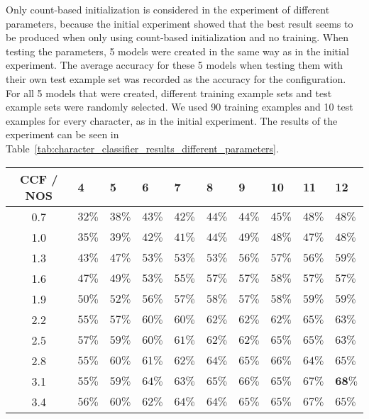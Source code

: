 Only count-based initialization is considered in the experiment of different parameters, because the initial experiment showed that the best result seems to be produced when only using count-based initialization and no training.
When testing the parameters, 5 models were created in the same way as in the initial experiment. 
The average accuracy for these 5 models when testing them with their own test example set was recorded as the accuracy for the configuration. 
For all 5 models that were created, different training example sets and test example sets were randomly selected. 
We used 90 training examples and 10 test examples for every character, as in the initial experiment. 
The results of the experiment can be seen in Table~\ref{tab:character_classifier_results_different_parameters}.

\begin{table}[htb]
  \begin{center}
  \begin{tabular}{ c | l l l l l l l l l }
CCF / NOS &    4   & 5      & 6      & 7      & 8      & 9      & 10     & 11     & 12 \\ \hline
0.7     &  $32\%$  &  $38\%$  &  $43\%$  &  $42\%$  &  $44\%$  &  $44\%$  &  $45\%$  &  $48\%$  &  $48\%$  \\
1.0     &  $35\%$  &  $39\%$  &  $42\%$  &  $41\%$  &  $44\%$  &  $49\%$  &  $48\%$  &  $47\%$  &  $48\%$  \\
1.3     &  $43\%$  &  $47\%$  &  $53\%$  &  $53\%$  &  $53\%$  &  $56\%$  &  $57\%$  &  $56\%$  &  $59\%$  \\
1.6     &  $47\%$  &  $49\%$  &  $53\%$  &  $55\%$  &  $57\%$  &  $57\%$  &  $58\%$  &  $57\%$  &  $57\%$  \\
1.9     &  $50\%$  &  $52\%$  &  $56\%$  &  $57\%$  &  $58\%$  &  $57\%$  &  $58\%$  &  $59\%$  &  $59\%$  \\
2.2     &  $55\%$  &  $57\%$  &  $60\%$  &  $60\%$  &  $62\%$  &  $62\%$  &  $62\%$  &  $65\%$  &  $63\%$  \\
2.5     &  $57\%$  &  $59\%$  &  $60\%$  &  $61\%$  &  $62\%$  &  $62\%$  &  $65\%$  &  $65\%$  &  $63\%$  \\
2.8     &  $55\%$  &  $60\%$  &  $61\%$  &  $62\%$  &  $64\%$  &  $65\%$  &  $66\%$  &  $64\%$  &  $65\%$  \\
3.1     &  $55\%$  &  $59\%$  &  $64\%$  &  $63\%$  &  $65\%$  &  $66\%$  &  $65\%$  &  $67\%$  &  $\textbf{68\%}$  \\
3.4     &  $56\%$  &  $60\%$  &  $62\%$  &  $64\%$  &  $64\%$  &  $65\%$  &  $65\%$  &  $67\%$  &  $65\%$  \\

\end{tabular}
\end{center}
\end{table}
